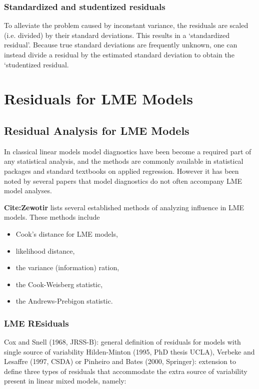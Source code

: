 \documentclass[Main.tex]{subfiles}
\begin{document}
\subsection{Standardized and studentized residuals} %

To alleviate the problem caused by inconstant variance, the residuals are scaled (i.e. divided) by their standard deviations. This results in a `standardized residual'. Because true standard deviations are frequently unknown, one can instead divide a residual by the estimated standard deviation to obtain the `studentized residual. 


\chapter{Residuals for LME Models}

\section{Residual Analysis for LME Models}

In classical linear models model diagnostics have been become a required part of any statistical analysis, and the methods are commonly available in statistical packages and standard textbooks on applied regression. However it has been noted by several papers that model diagnostics do not often accompany LME model analyses.

\textbf{Cite:Zewotir} lists several established methods of analyzing influence in LME models. These methods include \begin{itemize}
	\item Cook's distance for LME models,
	\item {} likelihood distance,
	\item the variance (information) ration,
	\item the  Cook-Weisberg statistic,
	\item the  Andrews-Prebigon statistic.
\end{itemize}




\subsection{LME REsiduals}	
Cox and Snell (1968, JRSS-B): general definition of residuals for
models with single source of variability
Hilden-Minton (1995, PhD thesis UCLA), Verbeke and Lesaffre
(1997, CSDA) or Pinheiro and Bates (2000, Springer): extension to
define three types of residuals that accommodate the extra source of
variability present in linear mixed models, namely:
\end{document}

